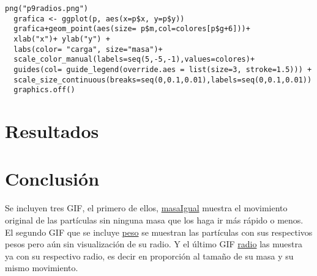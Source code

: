 \documentclass[a4paper]{article}
\begin{document}
\begin{lstlisting}[frame=single]
  png("p9radios.png")
  grafica <- ggplot(p, aes(x=p$x, y=p$y))
  grafica+geom_point(aes(size= p$m,col=colores[p$g+6]))+ 
  xlab("x")+ ylab("y") + 
  labs(color= "carga", size="masa")+
  scale_color_manual(labels=seq(5,-5,-1),values=colores)+
  guides(col= guide_legend(override.aes = list(size=3, stroke=1.5))) +
  scale_size_continuous(breaks=seq(0,0.1,0.01),labels=seq(0,0.1,0.01))
  graphics.off()
\end{lstlisting}




\section{Resultados}






\section{Conclusión}
Se incluyen tres GIF, el primero de ellos, \href{https://github.com/ValeryGomez/SimulacionSistemas/blob/master/P9/MasaIgual.gif}{masaIgual} muestra el movimiento original de las partículas sin ninguna masa que los haga ir más rápido o menos. El segundo GIF que se incluye \href{https://github.com/ValeryGomez/SimulacionSistemas/blob/master/P9/Peso.gif}{peso} se muestran las partículas con sus respectivos pesos pero aún sin visualización de su radio. Y el último GIF \href{https://github.com/ValeryGomez/SimulacionSistemas/blob/master/P9/Radios.gif}{radio} las muestra ya con su respectivo radio, es decir en proporción al tamaño de su masa y su mismo movimiento.
\end{document}

